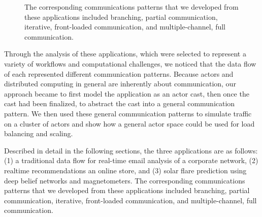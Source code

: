 \documentclass[conference,twocolumn,11pt]{IEEEtran}
\begin{document}
\begin{figure}[!t]
    \centering
    \hfil
    \hfil
    \caption{The corresponding communications patterns that we developed from these applications included branching, partial communication, iterative, front-loaded communication, and multiple-channel, full communication.}
    \label{fig:communications_patterns}
\end{figure}

Through the analysis of these applications, which were selected to represent a variety of workflows and computational challenges, we noticed that the data flow of each represented different communication patterns. Because actors and distributed computing in general are inherently about communication, our approach became to first model the application as an actor cast, then once the cast had been finalized, to abstract the cast into a general communication pattern. We then used these general communication patterns to simulate traffic on a cluster of actors and show how a general actor space could be used for load balancing and scaling.

Described in detail in the following sections, the three applications are as follows: (1) a traditional data flow for real-time email analysis of a corporate network, (2) realtime recommendations an online store, and (3) solar flare prediction using deep belief networks and magnetometers. The corresponding communications patterns that we developed from these applications included branching, partial communication, iterative, front-loaded communication, and multiple-channel, full communication.
\end{document}
